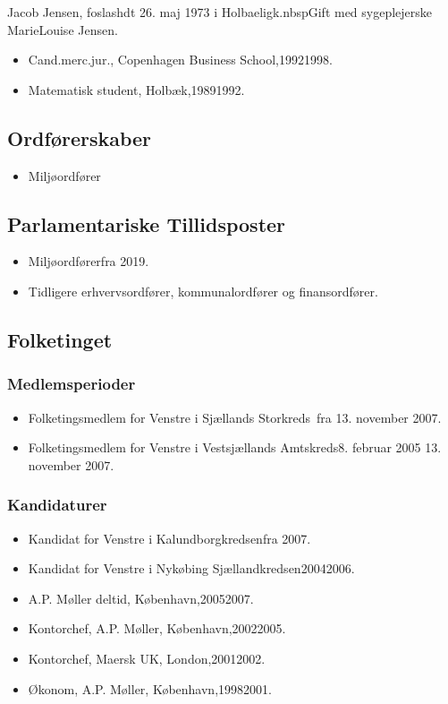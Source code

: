 \documentclass[11pt, a4paper]{awesome-cv}
\begin{document}
\makecvheader[R]
\makelettertitle
\begin{cvletter}
Jacob Jensen, foslashdt 26. maj 1973 i Holbaeligk.nbspGift med sygeplejerske MarieLouise Jensen.

\begin{itemize}
\item Cand.merc.jur., Copenhagen Business School,19921998.
\item Matematisk student, Holbæk,19891992.
\end{itemize}
\subsection*{Ordførerskaber}
\begin{itemize}
\item Miljøordfører
\end{itemize}
\subsection*{Parlamentariske Tillidsposter}
\begin{itemize}
\item Miljøordførerfra 2019.
\item Tidligere erhvervsordfører, kommunalordfører og finansordfører.
\end{itemize}
\subsection*{Folketinget}
\subsubsection*{Medlemsperioder}
\begin{itemize}
\item Folketingsmedlem for Venstre i Sjællands Storkreds fra 13. november 2007.
\item Folketingsmedlem for Venstre i Vestsjællands Amtskreds8. februar 2005  13. november 2007.
\end{itemize}
\subsubsection*{Kandidaturer}
\begin{itemize}
\item Kandidat for Venstre i Kalundborgkredsenfra 2007.
\item Kandidat for Venstre i Nykøbing Sjællandkredsen20042006.
\end{itemize}
\begin{itemize}
\item A.P. Møller deltid, København,20052007.
\item Kontorchef, A.P. Møller, København,20022005.
\item Kontorchef, Maersk UK, London,20012002.
\item Økonom, A.P. Møller, København,19982001.
\end{itemize}
\end{cvletter}
\end{document}
